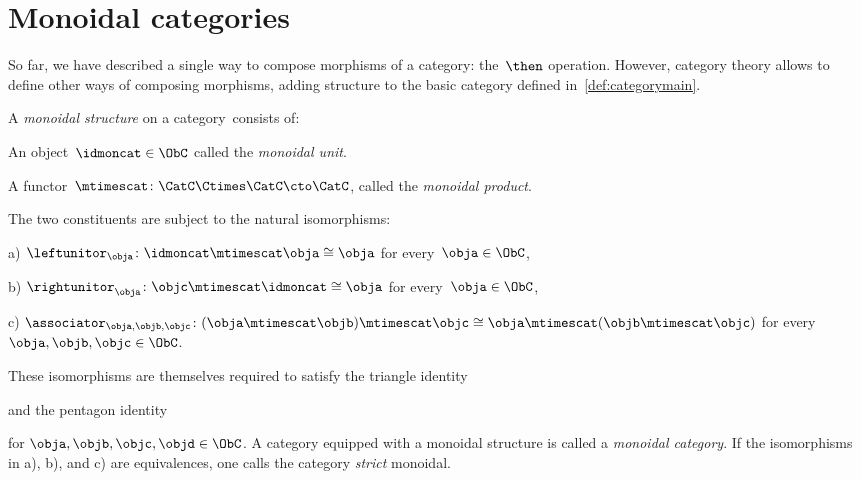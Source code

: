 

\section{Monoidal categories}
\label{sec:parallelism-mon-cat}

So far, we have described a single way to compose morphisms of a category: the~$\then$ operation. However, category theory allows to define other ways of composing morphisms, adding structure to the basic category defined in~\cref{def:categorymain}.


\begin{ctdefinition}
  \label{def:monoidal_cat}
  A \emph{monoidal structure} on a category~\CatC consists of:
  \begin{compactenum}
    \item An object~$\idmoncat \in \ObC$ called the \emph{monoidal unit}.
    \item A functor~$\mtimescat \colon \CatC \Ctimes \CatC\cto \CatC$, called the \emph{monoidal product}.
  \end{compactenum}
  The two constituents are subject to the natural isomorphisms:
  \begin{compactenum}
    \item[a)] $\leftunitor_\obja \colon \idmoncat\mtimescat \obja \cong \obja$ for every~$\obja\in \ObC$,
    \item[b)] $\rightunitor_\obja \colon \objc \mtimescat \idmoncat \cong \obja$ for every~$\obja\in \ObC$,
    \item[c)] $\associator_{\obja,\objb,\objc}\colon (\obja \mtimescat \objb )\mtimescat \objc \cong \obja\mtimescat (\objb \mtimescat \objc)$ for every~$\obja,\objb,\objc\in \ObC$.
  \end{compactenum}
  These isomorphisms are themselves required to satisfy the triangle identity
  \begin{center}
  \end{center}
  and the pentagon identity
  \begin{center}
  \end{center}
  for $\obja,\objb,\objc,\objd\in \ObC$.
  \noindent A category equipped with a monoidal structure is called a \emph{monoidal category}.
  If the isomorphisms in a), b), and c) are equivalences, one calls the category \emph{strict} monoidal.
\end{ctdefinition}

